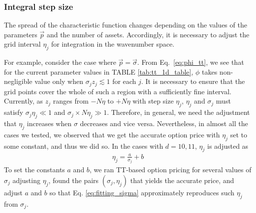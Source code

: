 \subsubsection*{Integral step size}
The spread of the characteristic function changes depending on the values of the parameters $\vec{p}$ and the number of assets. 
Accordingly, it is necessary to adjust the grid interval $\eta_j$ for integration in the wavenumber space.

For example, consider the case where $\vec{p}=\vec{\sigma}$. 
From Eq.~\eqref{eq:phi_tt}, we see that for the current parameter values in TABLE \ref{tab:tt_1d_table}, $\phi$ takes non-negligible value only when $\sigma_j z_j \lesssim 1$ for each $j$.
It is necessary to ensure that the grid points cover the whole of such a region with a sufficiently fine interval. Currently, as $z_j$ ranges from $-N\eta$ to $+N\eta$ with step size $\eta_j$, $\eta_j$ and $\sigma_j$ must satisfy $\sigma_j \eta_j \ll 1$ and $\sigma_j \times N \eta_j \gg 1$.
Therefore, in general, we need the adjustment that $\eta_j$ increases when $\sigma$ decreases and vice versa.
Nevertheless, in almost all the cases we tested, we observed that we get the accurate option price with $\eta_j$ set to some constant, and thus we did so.
In the cases with $d=10, 11$, $\eta_j$ is adjusted as
\begin{align}
    \eta_j = \frac{a}{\sigma_j} + b
    \label{eq:fitting_sigma}
\end{align}
To set the constants $a$ and $b$, we ran TT-based option pricing for several values of $\sigma_j$ adjusting $\eta_j$, found the pairs $(\sigma_j,\eta_j)$ that yields the accurate price, and adjust $a$ and $b$ so that Eq. \eqref{eq:fitting_sigma} approximately reproduces such $\eta_j$ from $\sigma_j$.




\begin{comment}
For example, in our numerical calculations, for $d=5$ to $9$, it was possible to accurately compute the option prices with a constant value of $\eta$ regardless of the asset. 
When $d=10$, it became necessary to adjust $\eta$ for each asset individually. 
Figure~\ref{fig:sigma_tts} represents the tensor trains when \(\eta\) is not adjusted for each asset and when it is adjusted for each asset.
In Fig.~\ref{fig:sigma_tts}(a) for $d=5$, the equation $\eqref{eq:vmin_tt}$ does not depend on $\vec{\sigma}$, while in Fig. ~\ref{fig:sigma_tts}(b) for $d=10$, the equation $\eqref{eq:vmin_tt}$ depends on the parameter $\vec{\sigma}$, which should have no dependence. 
This is because from eq.~\eqref{eq:V_continuous}, the equation $\eqref{eq:vmin_tt}$ becomes a function of $\eta$, and in this case, $\eta$ is varied for each asset, making $\eta$ a function of $\sigma$.
\end{comment}

